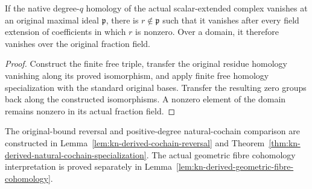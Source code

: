 \begin{corollary}
\label{cor:kn-derived-chain-homology-specialization}
\leanok
If the native degree-$q$ homology of the actual scalar-extended
complex vanishes at an original maximal ideal $\mathfrak p$, there
is $r\notin\mathfrak p$ such that it vanishes after every field
extension of coefficients in which $r$ is nonzero.  Over a domain,
it therefore vanishes over the original fraction field.
\end{corollary}
\begin{proof}
Construct the finite free triple, transfer the original residue
homology vanishing along its proved isomorphism, and apply finite
free homology specialization with the standard original bases.
Transfer the resulting zero groups back along the constructed
isomorphisms.  A nonzero element of the domain remains nonzero
in its actual fraction field.
\end{proof}

\begin{remark}
\label{rmk:kn-derived-finite-free-triples-geometric-boundary}
The original-bound reversal and positive-degree natural-cochain
comparison are constructed in
Lemma~\ref{lem:kn-derived-cochain-reversal} and
Theorem~\ref{thm:kn-derived-natural-cochain-specialization}.
The actual geometric fibre cohomology interpretation is proved
separately in Lemma~\ref{lem:kn-derived-geometric-fibre-cohomology}.
\end{remark}
